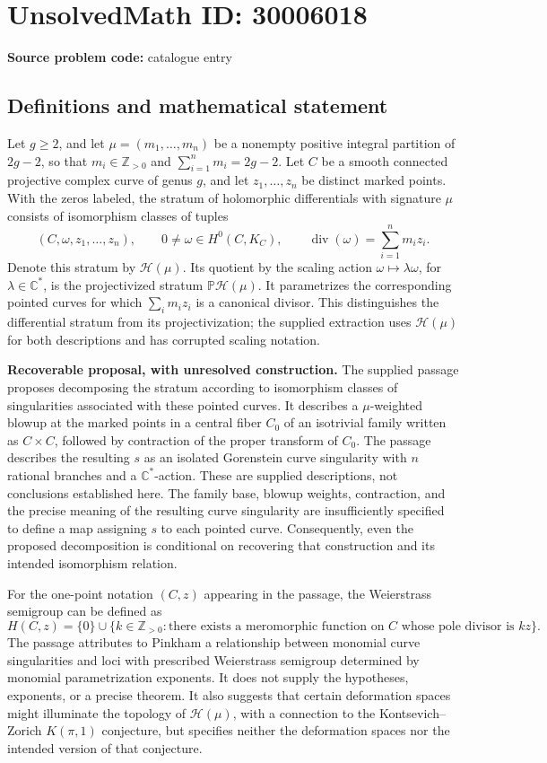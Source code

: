 \documentclass[11pt]{article}
\newcommand{\Z}{\mathbb{Z}}
\newcommand{\C}{\mathbb{C}}
\begin{document}
\section*{UnsolvedMath ID: 30006018}
\textbf{Source problem code:} catalogue entry
\subsection{Definitions and mathematical statement}
Let \(g\geq 2\), and let \(\mu=(m_1,\ldots,m_n)\) be a nonempty positive integral partition of \(2g-2\), so that \(m_i\in\Z_{>0}\) and \(\sum_{i=1}^n m_i=2g-2\). Let \(C\) be a smooth connected projective complex curve of genus \(g\), and let \(z_1,\ldots,z_n\) be distinct marked points. With the zeros labeled, the stratum of holomorphic differentials with signature \(\mu\) consists of isomorphism classes of tuples
\[
(C,\omega,z_1,\ldots,z_n),\qquad
0\neq\omega\in H^0(C,K_C),\qquad
\operatorname{div}(\omega)=\sum_{i=1}^n m_i z_i.
\]
Denote this stratum by \(\mathcal H(\mu)\). Its quotient by the scaling action \(\omega\mapsto\lambda\omega\), for \(\lambda\in\C^*\), is the projectivized stratum \(\mathbb P\mathcal H(\mu)\). It parametrizes the corresponding pointed curves for which \(\sum_i m_i z_i\) is a canonical divisor. This distinguishes the differential stratum from its projectivization; the supplied extraction uses \(\mathcal H(\mu)\) for both descriptions and has corrupted scaling notation.

\textbf{Recoverable proposal, with unresolved construction.} The supplied passage proposes decomposing the stratum according to isomorphism classes of singularities associated with these pointed curves. It describes a \(\mu\)-weighted blowup at the marked points in a central fiber \(C_0\) of an isotrivial family written as \(C\times C\), followed by contraction of the proper transform of \(C_0\). The passage describes the resulting \(s\) as an isolated Gorenstein curve singularity with \(n\) rational branches and a \(\C^*\)-action. These are supplied descriptions, not conclusions established here. The family base, blowup weights, contraction, and the precise meaning of the resulting curve singularity are insufficiently specified to define a map assigning \(s\) to each pointed curve. Consequently, even the proposed decomposition is conditional on recovering that construction and its intended isomorphism relation.

For the one-point notation \((C,z)\) appearing in the passage, the Weierstrass semigroup can be defined as
\[
H(C,z)=\{0\}\cup\{k\in\Z_{>0}:\text{there exists a meromorphic function on }C\text{ whose pole divisor is }kz\}.
\]
The passage attributes to Pinkham a relationship between monomial curve singularities and loci with prescribed Weierstrass semigroup determined by monomial parametrization exponents. It does not supply the hypotheses, exponents, or a precise theorem. It also suggests that certain deformation spaces might illuminate the topology of \(\mathcal H(\mu)\), with a connection to the Kontsevich--Zorich \(K(\pi,1)\) conjecture, but specifies neither the deformation spaces nor the intended version of that conjecture.
\end{document}
